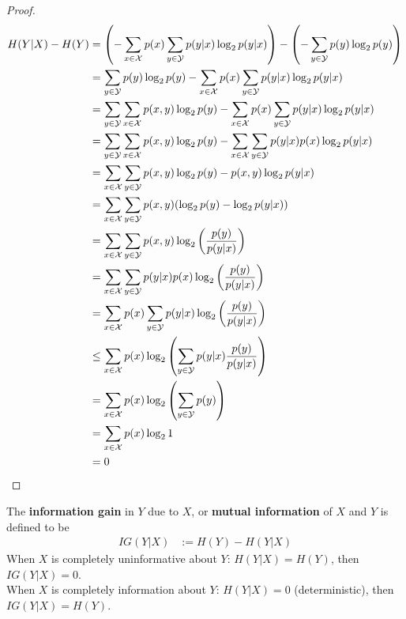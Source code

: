 \documentclass{article}
\begin{document}
	\begin{proof}
		\begin{align}
			H(Y|X) - H(Y) &=  \left( - \sum_{x \in \mathcal{{X}}} p(x) \sum_{y \in \mathcal{{Y}}}p(y|x) \log_2 p(y|x) \right) 
			- \left(- \sum_{y \in \mathcal{{Y}}} p(y) \log_2 p(y) \right) \\
			&= \sum_{y \in \mathcal{{Y}}} p(y) \log_2 p(y) - \sum_{x \in \mathcal{{X}}} p(x) \sum_{y \in \mathcal{{Y}}}p(y|x) \log_2 p(y|x) \\
			&= \sum_{y \in \mathcal{{Y}}} \sum_{x \in \mathcal{{X}}} p(x, y) \log_2 p(y)
			- \sum_{x \in \mathcal{{X}}} p(x) \sum_{y \in \mathcal{{Y}}} p(y|x) \log_2 p(y|x) \\
			&= \sum_{y \in \mathcal{{Y}}} \sum_{x \in \mathcal{{X}}} p(x, y) \log_2 p(y)
			- \sum_{x \in \mathcal{{X}}} \sum_{y \in \mathcal{{Y}}} p(y|x) p(x) \log_2 p(y|x) \\
			&= \sum_{x \in \mathcal{{X}}} \sum_{y \in \mathcal{{Y}}} p(x, y) \log_2 p(y)
			- p(x, y) \log_2 p(y|x) \\
			&= \sum_{x \in \mathcal{{X}}} \sum_{y \in \mathcal{{Y}}} p(x, y) (\log_2 p(y) - \log_2 p(y|x) ) \\
			&= \sum_{x \in \mathcal{{X}}} \sum_{y \in \mathcal{{Y}}} p(x, y) \log_2 \left(\frac{p(y)}{p(y|x)} \right) \\
			&= \sum_{x \in \mathcal{{X}}} \sum_{y \in \mathcal{{Y}}} p(y|x) p(x) \log_2 \left(\frac{p(y)}{p(y|x)} \right) \\
			&= \sum_{x \in \mathcal{{X}}} p(x) \sum_{y \in \mathcal{{Y}}} p(y|x) \log_2 \left(\frac{p(y)}{p(y|x)} \right) \\
			&\leq \sum_{x \in \mathcal{{X}}} p(x) \log_2 \left(
			\sum_{y \in \mathcal{{Y}}} p(y|x) \frac{p(y)}{p(y|x)}
			\right) \\
			&= \sum_{x \in \mathcal{{X}}} p(x) \log_2 \left(
			\sum_{y \in \mathcal{{Y}}} p(y)
			\right) \\
			&= \sum_{x \in \mathcal{{X}}} p(x) \log_2 1 \\
			&= 0
		\end{align}
	\end{proof}
	
	\begin{definition}
		The \textbf{information gain} in $Y$ due to $X$, or \textbf{mutual information} of $X$ and $Y$ is defined to be
		\begin{align}
			IG(Y|X) &:= H(Y) - H(Y|X)
		\end{align}
		When $X$ is completely uninformative about $Y$: $H(Y|X) = H(Y)$, then $IG(Y|X) = 0$.\\
		When $X$ is completely information about $Y$: $H(Y|X) = 0$ (deterministic), then $IG(Y|X) = H(Y)$.
	\end{definition}
	
\end{document}
